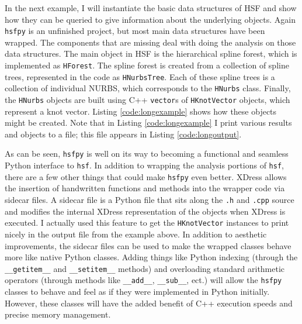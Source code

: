   In the next example, I will instantiate the basic data structures of HSF and show how they can be queried to give information about the underlying objects. Again \texttt{hsfpy} is an unfinished project, but most main data structures have been wrapped. The components that are missing deal with doing the analysis on those data structures. The main object in HSF is the hierarchical spline forest, which is implemented as \texttt{HForest}. The spline forest is created from a collection of spline trees, represented in the code as \texttt{HNurbsTree}. Each of these spline trees is a collection of individual NURBS, which corresponds to the \texttt{HNurbs} class. Finally, the \texttt{HNurbs} objects are built using C++ \texttt{vector}s of \texttt{HKnotVector} objects, which represent a knot vector. Listing \ref{code:longexample} shows how these objects might be created. Note that in Listing \ref{code:longexample} I print various results and objects to a file; this file appears in Listing \ref{code:longoutput}.

  \vspace{.2in}
  
  \mainstretch{}

  \vspace{.2in}
  
  \mainstretch{}

  As can be seen, \texttt{hsfpy} is well on its way to becoming a functional and seamless Python interface to \texttt{hsf}. In addition to wrapping the analysis portions of \texttt{hsf}, there are a few other things that could make \texttt{hsfpy} even better.  XDress allows the insertion of handwritten functions and methods into the wrapper code via sidecar files. A sidecar file is a Python file that sits along the \texttt{.h} and \texttt{.cpp} source and modifies the internal XDress representation of the objects when XDress is executed. I actually used this feature to get the \texttt{HKnotVector} instances to print nicely in the output file from the example above. In addition to aesthetic improvements, the sidecar files can be used to make the wrapped classes behave more like native Python classes. Adding things like Python indexing (through the \texttt{\_\_getitem\_\_} and \texttt{\_\_setitem\_\_} methods) and overloading standard arithmetic operators (through methods like \texttt{\_\_add\_\_}, \texttt{\_\_sub\_\_}, ect.) will allow the \texttt{hsfpy} classes to behave and feel as if they were implemented in Python initially. However, these classes will have the added benefit of C++ execution speeds and precise memory management.

